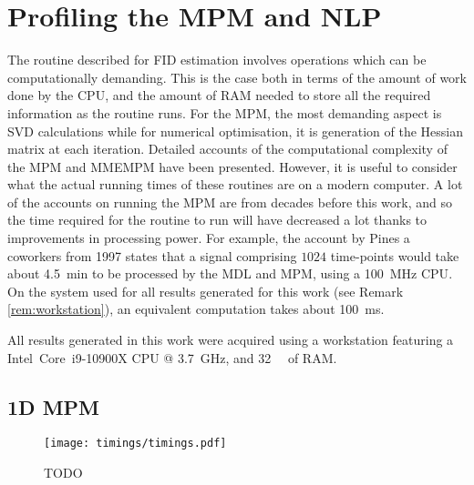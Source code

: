 \section{Profiling the \acs{MPM} and \acs{NLP}}
The routine described for \ac{FID} estimation involves operations which can be
computationally demanding. This is the case both in terms of the amount of work
done by the \ac{CPU}, and the amount of \ac{RAM} needed to store all the
required information as the routine runs. For the \ac{MPM}, the most
demanding aspect is \ac{SVD} calculations while for numerical optimisation, it
is generation of the Hessian matrix at each iteration. Detailed accounts of the
computational complexity of the \ac{MPM} and \ac{MMEMPM} have been
presented\cite{Hua1992,Chen2007}.  However, it is useful to consider what the
actual running times of these routines are on a modern computer. A lot of the
accounts on running the \ac{MPM} are from decades before this work, and so the
time required for the routine to run will have decreased a lot thanks to
improvements in processing power. For example, the account by Pines a coworkers
from 1997 states that a signal comprising $1024$ time-points would take about
\qty{4.5}{\minute} to be processed by the \ac{MDL} and \ac{MPM}, using a
\qty{100}{\mega\hertz} \ac{CPU}\cite{Lin1997}. On the system used for all
results generated for this work (see Remark \ref{rem:workstation}), an
equivalent computation takes about \qty{100}{\milli\second}.
\begin{remark}
    \label{rem:workstation}
    All results generated in this work were acquired using a workstation
    featuring a Intel\textregistered\ Core\texttrademark\ i9-10900X CPU @
    \qty{3.7}{\giga\hertz}, and \qty{32}{\gibi\byte} of RAM.
\end{remark}

\subsection{\acs{1D} \acs{MPM}}
\begin{figure}
    \texttt{[image: timings/timings.pdf]}
    \caption{TODO}
    \label{fig:profiling}
\end{figure}

